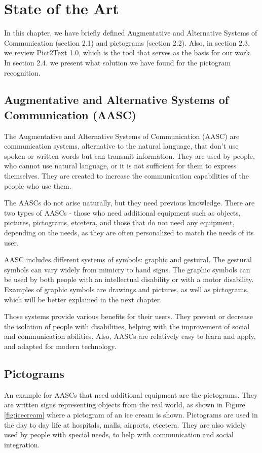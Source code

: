 
\chapter{State of the Art}
\label{State of the Art}

In this chapter, we have briefly defined Augmentative and Alternative Systems of Communication (section 2.1) and pictograms (section 2.2). Also, in section 2.3, we review Pict2Text 1.0, which is the tool that serves as the basis for our work. In section 2.4. we present what solution we have found for the pictogram recognition.


\section{Augmentative and Alternative Systems of Communication (AASC)}
The Augmentative and Alternative Systems of Communication (AASC)  are communication systems, alternative to the natural language, that don't use spoken or written words but can transmit information. They are used by people, who cannot use natural language, or it is not sufficient for them to express themselves. They are created to increase the communication capabilities of the people who use them.

The AASCs do not arise naturally, but they need previous knowledge. There are two types of AASCs - those who need additional equipment such as objects, pictures, pictograms, etcetera, and those that do not need any equipment, depending on the needs, as they are often personalized to match the needs of its user.

AASC includes different systems of symbols: graphic and gestural. The gestural symbols can vary widely from mimicry to hand signs. The graphic symbols can be used by both people with an intellectual disability or with a motor disability. Examples of graphic symbols are drawings and pictures, as well as pictograms, which will be better explained in the next chapter.

Those systems provide various benefits for their users. They prevent or decrease the isolation of people with disabilities, helping with the improvement of social and communication abilities. Also, AASCs are relatively easy to learn and apply, and adapted for modern technology. 


\section{Pictograms}
An example for AASCs that need additional equipment are the pictograms. They are written signs representing objects from the real world, as shown in Figure \ref{fig:icecream} where a pictogram of an ice cream is shown. Pictograms are used in the day to day life at hospitals, malls, airports, etcetera. They are also widely used by people with special needs, to help with communication and social integration.

